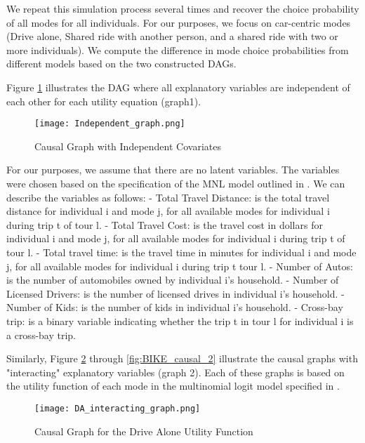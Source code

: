 We repeat this simulation process several times and recover the choice probability of all modes for all individuals.
For our purposes, we focus on car-centric modes (Drive alone, Shared ride with another person, 
and a shared ride with two or more individuals).
We compute the difference in mode choice probabilities from different models based on the two constructed DAGs.

Figure \ref{fig:IND_GRAPH} illustrates the DAG where all explanatory variables are independent of each other for each utility equation (graph1).

\begin{figure}
   \centering
   \texttt{[image: Independent\_graph.png]}
   \caption{Causal Graph with Independent Covariates}
   \label{fig:IND_GRAPH}
\end{figure}

For our purposes, we assume that there are no latent variables.
The variables were chosen based on the specification of the MNL model outlined in \citet{brathwaite_asymmetric}.
We can describe the variables as follows:
- Total Travel Distance: is the total travel distance for individual i and mode j, for all available modes for individual i during trip t of tour l.
- Total Travel Cost: is the travel cost in dollars for individual i and mode j, for all available modes for individual i during trip t of tour l.
- Total travel time: is the travel time in minutes for individual i and mode j, for all available modes for individual i during trip t tour l.
- Number of Autos: is the number of automobiles owned by individual i's household.
- Number of Licensed Drivers: is the number of licensed drives in individual i's household.
- Number of Kids: is the number of kids in individual i's household.
- Cross-bay trip: is a binary variable indicating whether the trip t in tour l for individual i is a cross-bay trip.

Similarly, Figure \ref{fig:DA_causal_2} through \ref{fig:BIKE_causal_2} illustrate the causal graphs with "interacting" explanatory variables (graph 2).
Each of these graphs is based on the utility function of each mode in the multinomial logit model specified in \citet{brathwaite_asymmetric}.

\begin{figure}
   \centering
   \texttt{[image: DA\_interacting\_graph.png]}
   \caption{Causal Graph for the Drive Alone Utility Function}
   \label{fig:DA_causal_2}
\end{figure}

